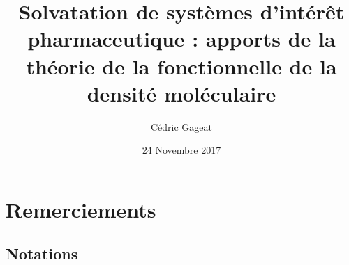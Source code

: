 \documentclass{bredele}
\title{Solvatation de systèmes d’intérêt pharmaceutique : apports de la théorie de la fonctionnelle de la densité moléculaire}
\author{Cédric Gageat}
\institute{l'\'Ecole Normale Supérieure}
\date{24 Novembre 2017}
\begin{document}
\frontmatter

\tikzexternaldisable
\maketitle{}
\tikzexternalenable


\cleardoublepage

\chapter*{Remerciements}


\clearemptydoublepage



\renewcommand\contentsname{Sommaire}
\tableofcontents
 
 
\renewcommand{\cftdotsep}{\cftnodots}
\cleardoublepage
\listoffigures
\cleardoublepage
\listoftables


\clearemptydoublepage
\section*{Notations}
\end{document}
